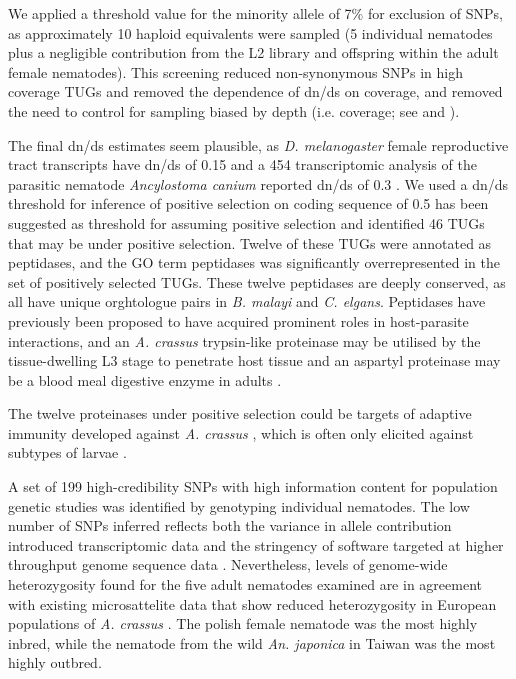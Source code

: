 \documentclass[10pt]{bmc_article}
\newenvironment{bmcformat}{\begin{raggedright}\baselineskip20pt\sloppy\setboolean{publ}{false}}{\end{raggedright}\baselineskip20pt\sloppy}
\begin{document}
\begin{bmcformat}
We applied a threshold value for the minority allele of 7\% for
exclusion of SNPs, as approximately 10 haploid equivalents were
sampled (5 individual nematodes plus a negligible contribution from
the L2 library and offspring within the adult female nematodes). This
screening reduced non-synonymous SNPs in high coverage TUGs and
removed the dependence of dn/ds on coverage, and removed the need to
control for sampling biased by depth (i.e. coverage; see
\cite{pmid18590545} and \cite{pmid20478048}).

The final dn/ds estimates seem plausible, as \textit{D. melanogaster}
female reproductive tract transcripts have dn/ds of 0.15
\cite{pmid15579698} and a 454 transcriptomic analysis of the parasitic
nematode \textit{Ancylostoma canium} reported dn/ds of 0.3
\cite{pmid20470405}. We used a dn/ds threshold for inference of
positive selection on coding sequence of 0.5 has been suggested as
threshold for assuming positive selection \cite{pmid15579698} and
identified 46 TUGs that may be under positive selection. Twelve of
these TUGs were annotated as peptidases, and the GO term peptidases
was significantly overrepresented in the set of positively selected
TUGs. These twelve peptidases are deeply conserved, as all have unique
orghtologue pairs in \textit{B. malayi} and
\textit{C. elgans}. Peptidases have previously been proposed to have
acquired prominent roles in host-parasite interactions, and an
\textit{A. crassus} trypsin-like proteinase may be utilised by the
tissue-dwelling L3 stage to penetrate host tissue and an aspartyl
proteinase may be a blood meal digestive enzyme in adults
\cite{polzer_identification_1993}.  

The twelve proteinases under positive selection could be targets of
adaptive immunity developed against \textit{A. crassus}
\cite{knopf_migratory_2008, knopf_vaccination_2008}, which is often
only elicited against subtypes of larvae \cite{molnar_caps}.

A set of 199 high-credibility SNPs with high information content for
population genetic studies was identified by genotyping individual
nematodes. The low number of SNPs inferred reflects both the variance
in allele contribution introduced transcriptomic data and the
stringency of software targeted at higher throughput genome sequence
data \cite{pmid21653522x}. Nevertheless, levels of genome-wide
heterozygosity found for the five adult nematodes examined are in
agreement with existing microsattelite data that show reduced
heterozygosity in European populations of \textit{A. crassus}
\cite{wielgoss_population_2008}. The polish female nematode was the
most highly inbred, while the nematode from the wild
\textit{An. japonica} in Taiwan was the most highly outbred.


\end{bmcformat}
\end{document}
